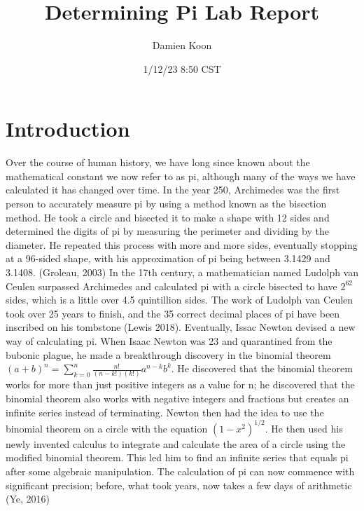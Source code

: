 \documentclass[12pt]{article}
\title{Determining Pi Lab Report}
\author{Damien Koon}
\date{1/12/23 8:50 CST}
\begin{document}
\maketitle
\doublespacing

\pagebreak

\section{Introduction}

     \hspace{4mm} Over the course of human history, we have long since known about the mathematical constant we now refer to as pi, although many of the ways we have calculated it has changed over time. In the year 250, Archimedes was the first person to accurately measure pi by using a method known as the bisection method. He took a circle and bisected it to make a shape with 12 sides and determined the digits of pi by measuring the perimeter and dividing by the diameter. He repeated this process with more and more sides, eventually stopping at a 96-sided shape, with his approximation of pi being between 3.1429 and 3.1408. (Groleau, 2003) In the 17th century, a mathematician named Ludolph van Ceulen surpassed Archimedes and calculated pi with a circle bisected to have $2^{62}$ sides, which is a little over 4.5 quintillion sides. The work of Ludolph van Ceulen took over 25 years to finish, and the 35 correct decimal places of pi have been inscribed on his tombstone (Lewis 2018). Eventually, Issac Newton devised a new way of calculating pi. When Isaac Newton was 23 and quarantined from the bubonic plague, he made a breakthrough discovery in the binomial theorem $(a + b)^{n} = \sum_{k=0}^{n} \frac{n!}{(n-k!)(k!)} a^{n-k} b^{k}$. He discovered that the binomial theorem works for more than just positive integers as a value for n; he discovered that the binomial theorem also works with negative integers and fractions but creates an infinite series instead of terminating. Newton then had the idea to use the binomial theorem on a circle with the equation $(1-x^{2})^{1/2}$. He then used his newly invented calculus to integrate and calculate the area of a circle using the modified binomial theorem. This led him to find an infinite series that equals pi after some algebraic manipulation. The calculation of pi can now commence with significant precision; before, what took years, now takes a few days of arithmetic (Ye, 2016) 

\pagebreak
\end{document}
